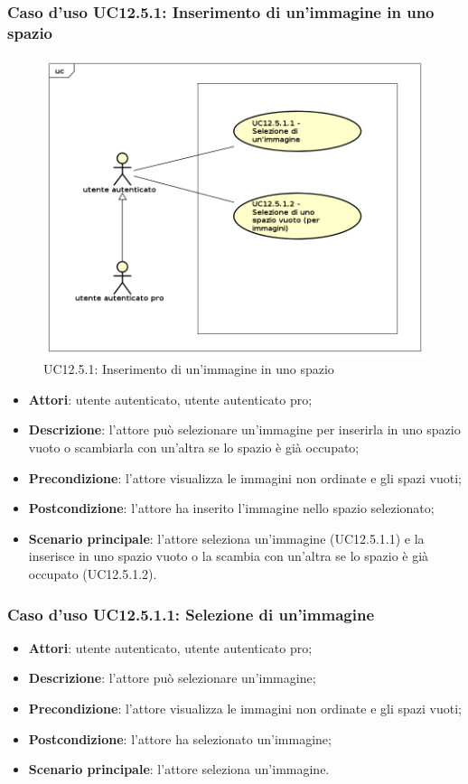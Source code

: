 \newpage
\subsubsection{Caso d'uso UC12.5.1: Inserimento di un'immagine in uno spazio}
\label{UC12.5.1}
\begin{figure}[h]
	\centering
	\includegraphics[scale=0.5]{UML/UC12_5_1.png}
	\caption{UC12.5.1: Inserimento di un'immagine in uno spazio}
\end{figure}
\begin{itemize}
\item \textbf{Attori}: utente autenticato, utente autenticato pro;
\item \textbf{Descrizione}: l'attore può selezionare un'immagine per inserirla in uno spazio vuoto o scambiarla con un'altra se lo spazio è già occupato;
\item \textbf{Precondizione}: l'attore visualizza le immagini non ordinate e gli spazi vuoti;
\item \textbf{Postcondizione}: l'attore ha inserito l'immagine nello spazio selezionato;
\item \textbf{Scenario principale}: l'attore seleziona un'immagine (UC12.5.1.1) e la inserisce in uno spazio vuoto o la scambia con un'altra se lo spazio è già occupato (UC12.5.1.2).
\end{itemize}

\subsubsection{Caso d'uso UC12.5.1.1: Selezione di un'immagine}
\begin{itemize}
\item \textbf{Attori}: utente autenticato, utente autenticato pro;
\item \textbf{Descrizione}: l'attore può selezionare un'immagine;
\item \textbf{Precondizione}: l'attore visualizza le immagini non ordinate e gli spazi vuoti;
\item \textbf{Postcondizione}: l'attore ha selezionato un'immagine;
\item \textbf{Scenario principale}: l'attore seleziona un'immagine.
\end{itemize}

